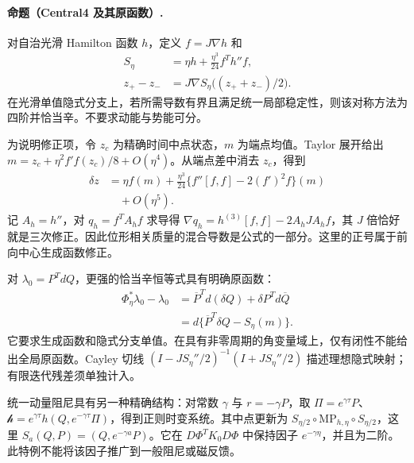 \paragraph{命题（Central4 及其原函数）.}\label{thm:central4}
对自治光滑 Hamilton 函数 $h$，定义 $f=J\nabla h$ 和
\begin{equation}
 \begin{aligned}
 S_\eta&=\eta h+\frac{\eta^3}{24}f^Th''f,\\
 z_+-z_-&=J\nabla S_\eta\bigl((z_++z_-)/2\bigr).
\end{aligned}
 \label{eq:th-central4}
\end{equation}
在光滑单值隐式分支上，若所需导数有界且满足统一局部稳定性，则该对称方法为四阶并恰当辛。不要求动能与势能可分。

为说明修正项，令 $z_c$ 为精确时间中点状态，$m$ 为端点均值。Taylor 展开给出 $m=z_c+\eta^2f'f(z_c)/8+O(\eta^4)$。从端点差中消去 $z_c$，得到
\begin{equation}
 \begin{aligned}
 \delta z&=\eta f(m)+\frac{\eta^3}{24}
          \{f''[f,f]-2(f')^2f\}(m)\\
 &\quad+O(\eta^5).
\end{aligned}
 \label{eq:th-central-expansion}
\end{equation}
记 $A_h=h''$，对 $q_h=f^TA_hf$ 求导得 $\nabla q_h=h^{(3)}[f,f]-2A_hJA_hf$，其 $J$ 倍恰好就是三次修正。因此位形相关质量的混合导数是公式的一部分。这里的正号属于前向中心生成函数修正。

对 $\lambda_0=P^TdQ$，更强的恰当辛恒等式具有明确原函数：
\begin{equation}
 \begin{aligned}
 \Phi_\eta^*\lambda_0-\lambda_0
 &=\overline P^Td(\delta Q)+\delta P^Td\overline Q\\
 &=d\{\overline P^T\delta Q-S_\eta(m)\}.
\end{aligned}
 \label{eq:th-primitive}
\end{equation}
它要求生成函数和隐式分支单值。在具有非零周期的角变量域上，仅有闭性不能给出全局原函数。Cayley 切线 $(I-JS_\eta''/2)^{-1}(I+JS_\eta''/2)$ 描述理想隐式映射；有限迭代残差须单独计入。

统一动量阻尼具有另一种精确结构：对常数 $\gamma$ 与 $r=-\gamma P$，取 $\Pi=e^{\gamma\tau}P$、$\mathcal h=e^{\gamma\tau}h(Q,e^{-\gamma\tau}\Pi)$，得到正则时变系统。其中点更新为 $S_{\eta/2}\circ\mathrm{MP}_{h,\eta}\circ S_{\eta/2}$，这里 $S_a(Q,P)=(Q,e^{-\gamma a}P)$。它在 $D\Phi^TK_0D\Phi$ 中保持因子 $e^{-\gamma\eta}$，并且为二阶。此特例不能将该因子推广到一般阻尼或磁反馈。

